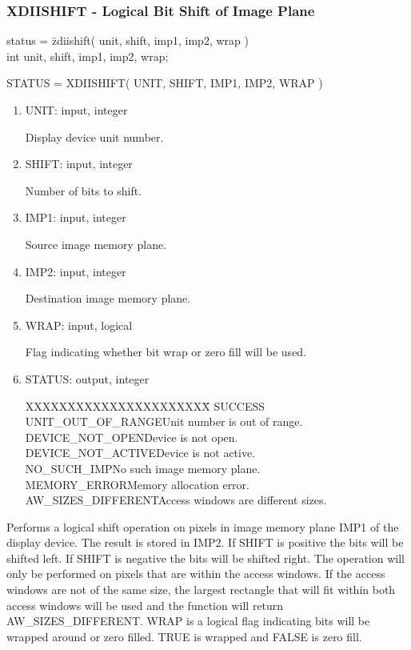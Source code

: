 \subsubsection{XDIISHIFT - Logical Bit Shift of Image Plane}
\begin{tabbing}
status = \=zdiishift( unit, shift, imp1, imp2, wrap )\\
\>int  unit, shift, imp1, imp2, wrap;\\
\end{tabbing}
STATUS = XDIISHIFT( UNIT, SHIFT, IMP1, IMP2, WRAP )
\begin{enumerate}
\item UNIT:  input, integer

Display device unit number.
\item SHIFT:  input, integer

Number of bits to shift.
\item IMP1:  input, integer

Source image memory plane.
\item IMP2:  input, integer

Destination image memory plane.
\item WRAP:  input, logical

Flag indicating whether bit wrap or zero fill will be used.
\item STATUS:  output, integer
\begin{tabbing}
XXXXXXXXXXXXXXXXXXXXXX\=\kill
SUCCESS\\
UNIT\_OUT\_OF\_RANGE\>Unit number is out of range.\\
DEVICE\_NOT\_OPEN\>Device is not open.\\
DEVICE\_NOT\_ACTIVE\>Device is not active.\\
NO\_SUCH\_IMP\>No such image memory plane.\\
MEMORY\_ERROR\>Memory allocation error.\\
AW\_SIZES\_DIFFERENT\>Access windows are different sizes.\\
\end{tabbing}
\end{enumerate}
Performs a logical shift operation on pixels in image memory plane
IMP1 of the display device.  The result is stored in IMP2.  If SHIFT
is positive the bits will be shifted left.  If SHIFT is negative the
bits will be shifted right.  The operation will only be performed on
pixels that are within the access windows.  If the access windows are
not of the same size, the largest rectangle that will fit within both
access windows will be used and the function will return AW\_SIZES\_DIFFERENT.
WRAP is a logical flag indicating bits will be wrapped around or zero filled.
TRUE is wrapped and FALSE is zero fill.
\newpage
